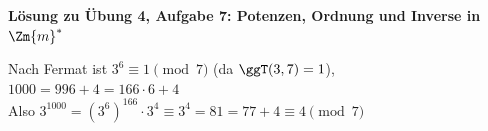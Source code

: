 \textbf{Lösung zu Übung 4, Aufgabe 7: Potenzen, Ordnung und Inverse in $\Zm{m}^*$}

\begin{loesung}
Nach Fermat ist $3^6 \equiv 1 \pmod 7$ (da $\ggT(3, 7) = 1$),\\
$1000 = 996 + 4 = 166 \cdot 6 + 4$\\
Also $3^{1000} = (3^6)^{166} \cdot 3^4 \equiv 3^4 = 81 = 77 + 4 \equiv 4 \pmod 7$
\end{loesung}
